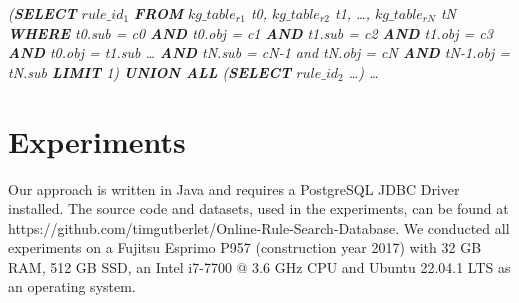 \documentclass[runningheads]{llncs}
\begin{document}
\noindent
\textit{(\textbf{SELECT} $rule\_id_1$ \textbf{FROM} $kg\_table_{r1}$ t0, $kg\_table_{r2}$ t1, …, $kg\_table_{rN}$ tN \textbf{WHERE}  t0.sub = c0 \textbf{AND} t0.obj = c1 \textbf{AND} t1.sub = c2 \textbf{AND} t1.obj = c3 \textbf{AND} t0.obj = t1.sub … \textbf{AND} tN.sub = cN-1 and tN.obj = cN \textbf{AND} tN-1.obj = tN.sub \textbf{LIMIT} 1) \textbf{UNION ALL} (\textbf{SELECT} $rule\_id_2$ …) …}


\section{Experiments}

Our approach is written in Java and requires a PostgreSQL JDBC Driver installed. The source code and datasets, used in the experiments, can be found at https://github.com/timgutberlet/Online-Rule-Search-Database. We conducted all experiments
on a Fujitsu Esprimo P957 (construction year 2017) with 32 GB RAM, 512 GB SSD, an Intel i7-7700 @ 3.6 GHz CPU and Ubuntu 22.04.1 LTS as an operating system.

\end{document}
